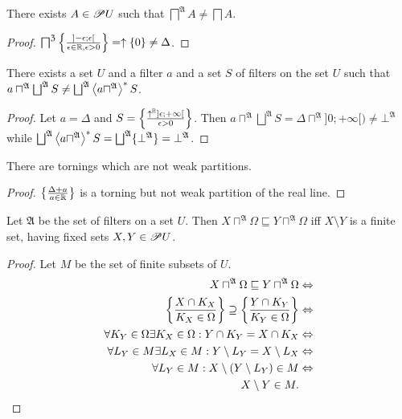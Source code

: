 \begin{example}
There exists $A\in\mathscr{P} U$ such that $\bigsqcap^{\mathfrak{A}}A\ne\bigsqcap A$.\end{example}
\begin{proof}
$\bigsqcap^{\mathfrak{Z}}\left\{ \frac{]-\epsilon;\epsilon[}{\epsilon\in\mathbb{R},\epsilon>0}\right\}=\uparrow\{0\}\ne\Delta$.\end{proof}
\begin{example}
There exists a set $U$ and a filter $a$ and a set $S$ of filters
on the set $U$ such that $a\sqcap^{\mathfrak{A}}\bigsqcup^{\mathfrak{A}}S\ne\bigsqcup^{\mathfrak{A}}\rsupfun{a\sqcap^{\mathfrak{A}}}S$.\end{example}
\begin{proof}
Let $a=\Delta$ and $S=\left\{ \frac{\uparrow^{\mathbb{R}}]\epsilon;+\infty[}{\epsilon>0}\right\}$.
Then $a\sqcap^{\mathfrak{A}}\bigsqcup^{\mathfrak{A}}S=\Delta\sqcap^{\mathfrak{A}}]0;+\infty[)\ne\bot^{\mathfrak{A}}$
while $\bigsqcup^{\mathfrak{A}}\rsupfun{a\sqcap^{\mathfrak{A}}}S=\bigsqcup^{\mathfrak{A}}\{\bot^{\mathfrak{A}}\}=\bot^{\mathfrak{A}}$.\end{proof}
\begin{example}
There are tornings which are not weak partitions.\end{example}
\begin{proof}
$\left\{ \frac{\Delta+a}{a\in\mathbb{R}}\right\}$ is a torning but not weak partition
of the real line.\end{proof}
\begin{lem}
Let $\mathfrak{A}$ be the set of filters on a set $U$. Then $X\sqcap^{\mathfrak{A}}\Omega\sqsubseteq Y\sqcap^{\mathfrak{A}}\Omega$
iff $X\setminus Y$ is a finite set, having fixed sets $X,Y\in\mathscr{P} U$.\end{lem}
\begin{proof}
Let $M$ be the set of finite subsets of $U$.
\begin{align*}
X\sqcap^{\mathfrak{A}}\Omega\sqsubseteq Y\sqcap^{\mathfrak{A}}\Omega & \Leftrightarrow\\
\left\{ \frac{X\cap K_{X}}{K_{X}\in\Omega}\right\}\supseteq\left\{ \frac{Y\cap K_{Y}}{K_{Y}\in\Omega}\right\} & \Leftrightarrow\\
\forall K_{Y}\in\Omega\exists K_{X}\in\Omega:Y\cap K_{Y}=X\cap K_{X} & \Leftrightarrow\\
\forall L_{Y}\in M\exists L_{X}\in M:Y\setminus L_{Y}=X\setminus L_{X} & \Leftrightarrow\\
\forall L_{Y}\in M:X\setminus(Y\setminus L_{Y})\in M & \Leftrightarrow\\
X\setminus Y\in M.
\end{align*}
\end{proof}
